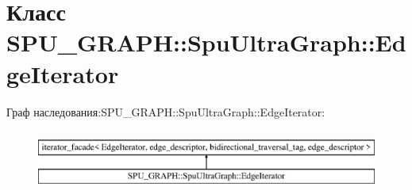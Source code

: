 \hypertarget{class_s_p_u___g_r_a_p_h_1_1_spu_ultra_graph_1_1_edge_iterator}{}\section{Класс S\+P\+U\+\_\+\+G\+R\+A\+PH\+:\+:Spu\+Ultra\+Graph\+:\+:Edge\+Iterator}
\label{class_s_p_u___g_r_a_p_h_1_1_spu_ultra_graph_1_1_edge_iterator}
Граф наследования\+:S\+P\+U\+\_\+\+G\+R\+A\+PH\+:\+:Spu\+Ultra\+Graph\+:\+:Edge\+Iterator\+:\begin{figure}[H]
\begin{center}
\leavevmode
\includegraphics[height=2.000000cm]{class_s_p_u___g_r_a_p_h_1_1_spu_ultra_graph_1_1_edge_iterator}
\end{center}
\end{figure}
